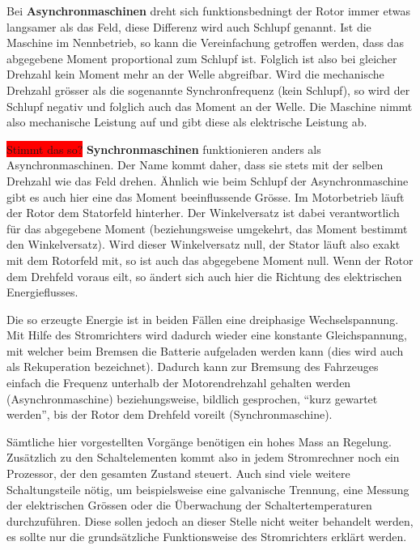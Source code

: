 Bei \textbf{Asynchronmaschinen} dreht sich funktionsbedningt der Rotor immer etwas langsamer als das Feld, diese Differenz wird auch Schlupf genannt. Ist die Maschine im Nennbetrieb, so kann die Vereinfachung getroffen werden, dass das abgegebene Moment proportional zum Schlupf ist. Folglich ist also bei gleicher Drehzahl kein Moment mehr an der Welle abgreifbar. Wird die mechanische Drehzahl grösser als die sogenannte Synchronfrequenz (kein Schlupf), so wird der Schlupf negativ und folglich auch das Moment an der Welle. Die Maschine nimmt also mechanische Leistung auf und gibt diese als elektrische Leistung ab.

\colorbox{red}{Stimmt das so?}
\textbf{Synchronmaschinen} funktionieren anders als Asynchronmaschinen. Der Name kommt daher, dass sie stets mit der selben Drehzahl wie das Feld drehen. Ähnlich wie beim Schlupf der Asynchronmaschine gibt es auch hier eine das Moment beeinflussende Grösse. Im Motorbetrieb läuft der Rotor dem Statorfeld hinterher. Der Winkelversatz ist dabei verantwortlich für das abgegebene Moment (beziehungsweise umgekehrt, das Moment bestimmt den Winkelversatz). Wird dieser Winkelversatz null, der Stator läuft also exakt mit dem Rotorfeld mit, so ist auch das abgegebene Moment null. Wenn der Rotor dem Drehfeld voraus eilt, so ändert sich auch hier die Richtung des elektrischen Energieflusses.

Die so erzeugte Energie ist in beiden Fällen eine dreiphasige Wechselspannung. Mit Hilfe des Stromrichters wird dadurch wieder eine konstante Gleichspannung, mit welcher beim Bremsen die Batterie aufgeladen werden kann (dies wird auch als Rekuperation bezeichnet). Dadurch kann zur Bremsung des Fahrzeuges einfach die Frequenz unterhalb der Motorendrehzahl gehalten werden (Asynchronmaschine) beziehungsweise, bildlich gesprochen, "`kurz gewartet werden"', bis der Rotor dem Drehfeld voreilt (Synchronmaschine).

Sämtliche hier vorgestellten Vorgänge benötigen ein hohes Mass an Regelung. Zusätzlich zu den Schaltelementen kommt also in jedem Stromrechner noch ein Prozessor, der den gesamten Zustand steuert. Auch sind viele weitere Schaltungsteile nötig, um beispielsweise eine galvanische Trennung, eine Messung der elektrischen Grössen oder die Überwachung der Schaltertemperaturen durchzuführen. Diese sollen jedoch an dieser Stelle nicht weiter behandelt werden, es sollte nur die grundsätzliche Funktionsweise des Stromrichters erklärt werden.

